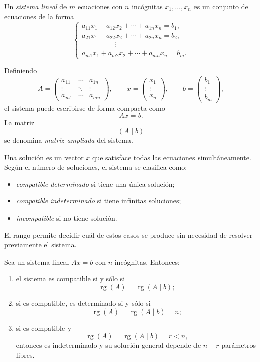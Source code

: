 \begin{definition}
Un \emph{sistema lineal} de $m$ ecuaciones con $n$ incógnitas $x_1,\ldots,x_n$ es un conjunto de ecuaciones de la forma
\[
\begin{cases}
a_{11}x_1+a_{12}x_2+\cdots+a_{1n}x_n=b_1,\\
a_{21}x_1+a_{22}x_2+\cdots+a_{2n}x_n=b_2,\\
\hspace{2cm}\vdots\\
a_{m1}x_1+a_{m2}x_2+\cdots+a_{mn}x_n=b_m.
\end{cases}
\]
\end{definition}

Definiendo
\[
A=
\begin{pmatrix}
a_{11}&\cdots&a_{1n}\\
\vdots&\ddots&\vdots\\
a_{m1}&\cdots&a_{mn}
\end{pmatrix},
\qquad
x=\begin{pmatrix}x_1\\\vdots\\x_n\end{pmatrix},
\qquad
b=\begin{pmatrix}b_1\\\vdots\\b_m\end{pmatrix},
\]
el sistema puede escribirse de forma compacta como
\[
\boxed{Ax=b.}
\]
La matriz
\[
(A\mid b)
\]
se denomina \emph{matriz ampliada} del sistema.

Una solución es un vector $x$ que satisface todas las ecuaciones simultáneamente. Según el número de soluciones, el sistema se clasifica como:

\begin{itemize}
\item \emph{compatible determinado} si tiene una única solución;
\item \emph{compatible indeterminado} si tiene infinitas soluciones;
\item \emph{incompatible} si no tiene solución.
\end{itemize}

El rango permite decidir cuál de estos casos se produce sin necesidad de resolver previamente el sistema.

\begin{theorem}
Sea un sistema lineal $Ax=b$ con $n$ incógnitas. Entonces:
\begin{enumerate}[label=\roman*)]
\item el sistema es compatible si y sólo si
\[
\operatorname{rg}(A)=\operatorname{rg}(A\mid b);
\]
\item si es compatible, es determinado si y sólo si
\[
\operatorname{rg}(A)=\operatorname{rg}(A\mid b)=n;
\]
\item si es compatible y
\[
\operatorname{rg}(A)=\operatorname{rg}(A\mid b)=r<n,
\]
entonces es indeterminado y su solución general depende de $n-r$ parámetros libres.
\end{enumerate}
\end{theorem}

